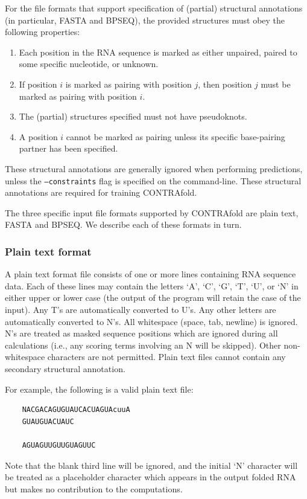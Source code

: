 \documentclass{article}
\begin{document}
  For the file formats that support specification of (partial)
  structural annotations (in particular, FASTA and BPSEQ), the
  provided structures must obey the following properties:
  \begin{enumerate}
  \item Each position in the RNA sequence is marked as either 
    unpaired, paired to some specific nucleotide, or unknown.
  \item If position $i$ is marked as pairing with position $j$, then
    position $j$ must be marked as pairing with position $i$.
  \item The (partial) structures specified must not have pseudoknots.
  \item A position $i$ cannot be marked as pairing unless its specific
    base-pairing partner has been specified.
  \end{enumerate}
  These structural annotations are generally ignored when performing
  predictions, unless the \texttt{--constraints} flag is specified on
  the command-line.  These structural annotations are required for training CONTRAfold.

  The three specific input file formats supported by
  CONTRAfold are plain text, FASTA and BPSEQ.  We describe each of
  these formats in turn.

  \subsubsection{Plain text format}
  \label{sec:plain}

  A plain text format file consists of one or more lines containing
  RNA sequence data. Each of these lines may contain the letters `A',
  `C', `G', `T', `U', or `N' in either upper or lower case (the output
  of the program will retain the case of the input).  Any T's are
  automatically converted to U's.  Any other letters are automatically
  converted to N's.  All whitespace (space, tab, newline) is ignored.
  N's are treated as masked sequence positions which are ignored
  during all calculations (i.e., any scoring terms involving an N will
  be skipped).  Other non-whitespace characters are not permitted.
  Plain text files cannot contain any secondary structural annotation.

  For example, the following is a valid plain text file:
  \begin{verbatim}
    NACGACAGUGUAUCACUAGUAcuuA
    GUAUGUACUAUC

    AGUAGUUGUUGUAGUUC\end{verbatim}
  Note that the blank third line will be ignored, and the initial `N'
  character will be treated as a placeholder character which appears
  in the output folded RNA but makes no contribution to the computations.
\end{document}
